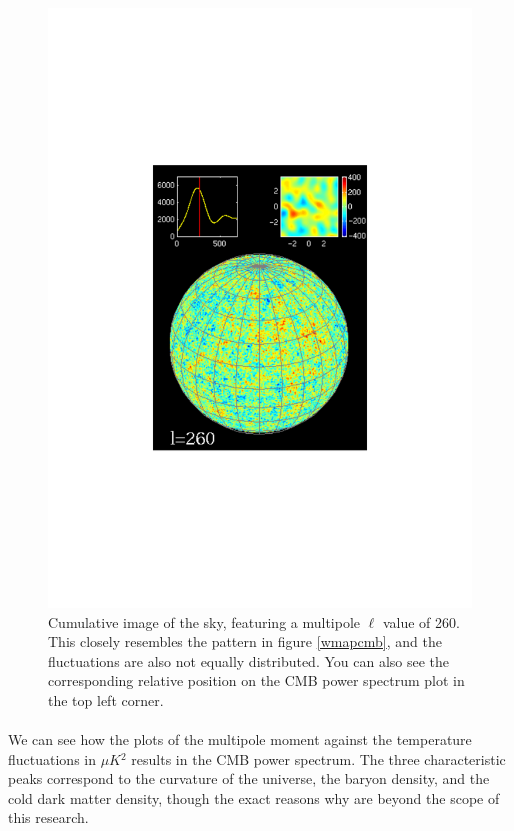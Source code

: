 \documentclass[twoside, fontsize=12pt,
     bibliography=totoc, %
     listof=totoc, %
     index=totoc, %
     onehalfspacing %
]{_MScDiss2017_cls}
\begin{document}
\begin{figure}
	\begin{center}
	\includegraphics[width=\textwidth]{cu-1000-031.pdf}
	\caption{Cumulative image of the sky, featuring a multipole $\ell$ value of 260. This closely resembles the pattern in figure \ref{wmapcmb}, and the fluctuations are also not equally distributed. You can also see the corresponding relative position on the CMB power spectrum plot in the top left corner. \cite{Pryke}}
	\label{cmball}
	\end{center}
\end{figure}

\paragraph{}

We can see how the plots of the multipole moment against the temperature fluctuations in $\mu$$K$$^2$ results in the CMB power spectrum. The three characteristic peaks correspond to the curvature of the universe, the baryon density, and the cold dark matter density, though the exact reasons why are beyond the scope of this research.
\end{document}
